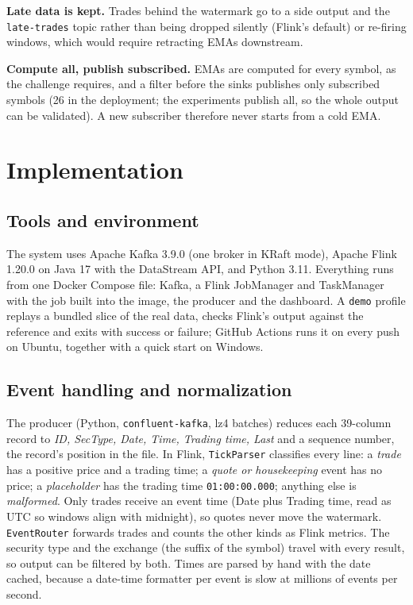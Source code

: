 \documentclass[sigconf]{acmart}
\begin{document}
\textbf{Late data is kept.} Trades behind the watermark go to a side output and the \texttt{late-trades} topic rather than being dropped silently (Flink's default) or re-firing windows, which would require retracting EMAs downstream.

\textbf{Compute all, publish subscribed.} EMAs are computed for every symbol, as the challenge requires, and a filter before the sinks publishes only subscribed symbols (26 in the deployment; the experiments publish all, so the whole output can be validated). A new subscriber therefore never starts from a cold EMA.

\section{Implementation}\label{sec:impl}

\subsection{Tools and environment}
The system uses Apache Kafka 3.9.0 (one broker in KRaft mode), Apache Flink 1.20.0 on Java 17 with the DataStream API, and Python 3.11. Everything runs from one Docker Compose file: Kafka, a Flink JobManager and TaskManager with the job built into the image, the producer and the dashboard. A \texttt{demo} profile replays a bundled slice of the real data, checks Flink's output against the reference and exits with success or failure; GitHub Actions runs it on every push on Ubuntu, together with a quick start on Windows.

\subsection{Event handling and normalization}
The producer (Python, \texttt{confluent-kafka}, lz4 batches) reduces each 39-column record to \textit{ID, SecType, Date, Time, Trading time, Last} and a sequence number, the record's position in the file. In Flink, \texttt{TickParser} classifies every line: a \emph{trade} has a positive price and a trading time; a \emph{quote or housekeeping} event has no price; a \emph{placeholder} has the trading time \texttt{01:00:00.000}; anything else is \emph{malformed}. Only trades receive an event time (Date plus Trading time, read as UTC so windows align with midnight), so quotes never move the watermark. \texttt{EventRouter} forwards trades and counts the other kinds as Flink metrics. The security type and the exchange (the suffix of the symbol) travel with every result, so output can be filtered by both. Times are parsed by hand with the date cached, because a date-time formatter per event is slow at millions of events per second.
\end{document}
